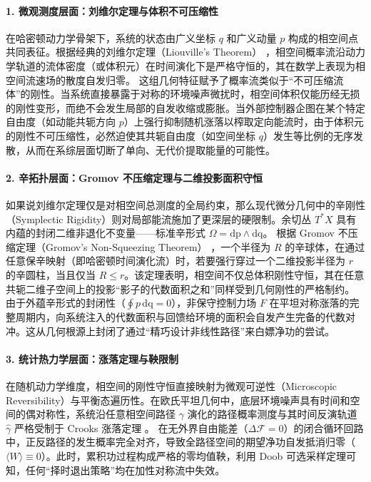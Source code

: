 ﻿\documentclass[10pt,a4paper]{article}
\numberwithin{equation}{section}
\begin{document}
\paragraph{1. 微观测度层面：刘维尔定理与体积不可压缩性}
在哈密顿动力学骨架下，系统的状态由广义坐标 $q$ 和广义动量 $p$ 构成的相空间点共同表征。根据经典的刘维尔定理（Liouville's Theorem） \cite{Goldstein2002Classical}，相空间概率流沿动力学轨道的流体密度（或体积元）在时间演化下是严格守恒的，其在数学上表现为相空间流速场的散度自发归零。
这组几何特征赋予了概率流类似于“不可压缩流体”的刚性。当系统直接暴露于对称的环境噪声微扰时，相空间体积仅能历经无损的刚性变形，而绝不会发生局部的自发收缩或膨胀。当外部控制器企图在某个特定自由度（如动能共轭方向 $p$）上强行抑制随机涨落以榨取定向能流时，由于体积元的刚性不可压缩性，必然迫使其共轭自由度（如空间坐标 $q$）发生等比例的无序发散，从而在系综层面切断了单向、无代价提取能量的可能性。

\paragraph{2. 辛拓扑层面：Gromov 不压缩定理与二维投影面积守恒}
如果说刘维尔定理仅是对相空间总测度的全局约束，那么现代微分几何中的辛刚性（Symplectic Rigidity）则对局部能流施加了更深层的硬限制。余切丛 $T^*X$ 具有内蕴的封闭二维非退化不变量——标准辛形式 $\Omega = \mathrm{dp} \wedge \mathrm{dq}$。
根据 Gromov 不压缩定理（Gromov's Non-Squeezing Theorem） \cite{Gromov1985Pseudo, McDuff2017Introduction}，一个半径为 $R$ 的辛球体，在通过任意保辛映射（即哈密顿时间演化流）时，若要强行穿过一个二维投影半径为 $r$ 的辛圆柱，当且仅当 $R \le r$。该定理表明，相空间不仅总体积刚性守恒，其在任意共轭二维子空间上的投影“影子的代数面积之和”同样受到几何刚性的严格制约。
由于外蕴辛形式的封闭性（$\oint p \,\mathrm{dq} = 0$），非保守控制力场 $F$ 在平坦对称涨落的完整周期内，向系统注入的代数面积与回馈给环境的面积会自发产生完备的代数对冲。这从几何根源上封闭了通过“精巧设计非线性路径”来白嫖净功的尝试。

\paragraph{3. 统计热力学层面：涨落定理与鞅限制}
在随机动力学维度，相空间的刚性守恒直接映射为微观可逆性（Microscopic Reversibility）与平衡态遍历性。在欧氏平坦几何中，底层环境噪声具有时间和空间的偶对称性，系统沿任意相空间路径 $\gamma$ 演化的路径概率测度与其时间反演轨道 $\hat{\gamma}$ 严格受制于 Crooks 涨落定理 \cite{Crooks1999Entropy}。
在无外界自由能差（$\Delta \mathcal{F}=0$）的闭合循环回路中，正反路径的发生概率完全对齐，导致全路径空间的期望净功自发抵消归零（$\langle W \rangle \equiv 0$）。此时，累积功过程构成严格的零均值鞅，利用 Doob 可选采样定理可知，任何“择时退出策略”均在加性对称流中失效。
\end{document}
